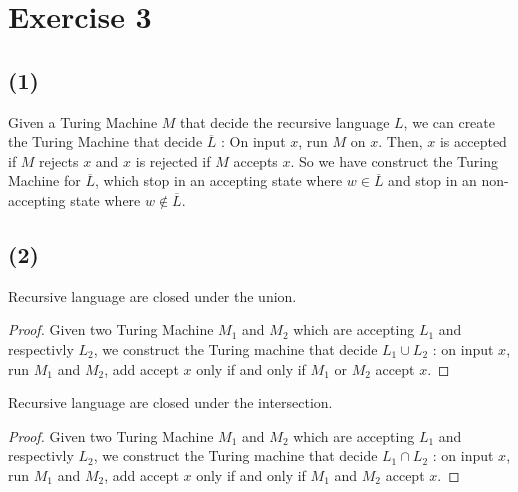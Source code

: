 \documentclass[a4paper,11pt]{report}
\begin{document}
\section*{Exercise 3}

\subsection*{(1)}
Given a Turing Machine $M$ that decide the recursive language $L$, we can
create the Turing Machine that decide $\overline{L}$ : On input $x$, run $M$ on
$x$. Then, $x$ is accepted if $M$ rejects $x$ and $x$ is rejected if $M$ accepts
$x$. So we have construct the Turing Machine for $\overline{L}$, which stop in
an accepting state where $w \in \overline{L}$ and stop in an non-accepting state
where $w \not\in \overline{L}$.

\subsection*{(2)}

Recursive language are closed under the union.

\begin{proof}
Given two Turing Machine $M_1$ and $M_2$ which are accepting $L_1$ and
respectivly $L_2$, we construct the Turing machine that decide $L_1 \cup L_2$ :
on input $x$, run $M_1$ and $M_2$, add accept $x$ only if and only if $M_1$ or
$M_2$ accept $x$.
\end{proof}

Recursive language are closed under the intersection.

\begin{proof}
Given two Turing Machine $M_1$ and $M_2$ which are accepting $L_1$ and
respectivly $L_2$, we construct the Turing machine that decide $L_1 \cap L_2$ :
on input $x$, run $M_1$ and $M_2$, add accept $x$ only if and only if $M_1$ and
$M_2$ accept $x$.
\end{proof}
\end{document}
